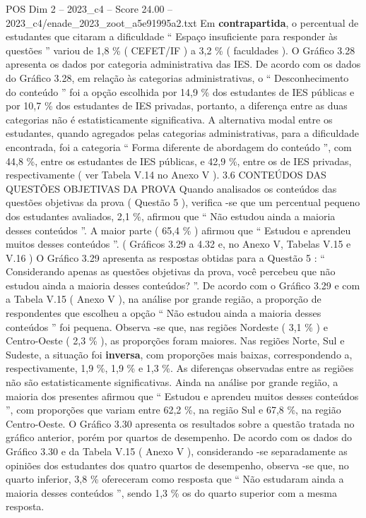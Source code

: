 \begin{textsample}{POS Dim 2 – 2023\_c4 – Score 24.00 – 2023\_c4/enade\_2023\_zoot\_a5e91995a2.txt}
Em \textbf{contrapartida}, o percentual de estudantes que citaram a dificuldade “ Espaço insuficiente para responder às questões ” variou de 1,8 \% ( CEFET/IF ) a 3,2 \% ( faculdades ).
O Gráfico 3.28 apresenta os dados por categoria administrativa das IES.
De acordo com os dados do Gráfico 3.28, em relação às categorias administrativas, o “ Desconhecimento do conteúdo ” foi a opção escolhida por 14,9 \% dos estudantes de IES públicas e por 10,7 \% dos estudantes de IES privadas, portanto, a diferença entre as duas categorias não é estatisticamente significativa.
A alternativa modal entre os estudantes, quando agregados pelas categorias administrativas, para a dificuldade encontrada, foi a categoria “ Forma diferente de abordagem do conteúdo ”, com 44,8 \%, entre os estudantes de IES públicas, e 42,9 \%, entre os de IES privadas, respectivamente ( ver Tabela V.14 no Anexo V ). 3.6 CONTEÚDOS DAS QUESTÕES OBJETIVAS DA PROVA Quando analisados os conteúdos das questões objetivas da prova ( Questão 5 ), verifica -se que um percentual pequeno dos estudantes avaliados, 2,1 \%, afirmou que “ Não estudou ainda a maioria desses conteúdos ”.
A maior parte ( 65,4 \% ) afirmou que “ Estudou e aprendeu muitos desses conteúdos ”. ( Gráficos 3.29 a 4.32 e, no Anexo V, Tabelas V.15 e V.16 ) O Gráfico 3.29 apresenta as respostas obtidas para a Questão 5 : “ Considerando apenas as questões objetivas da prova, você percebeu que não estudou ainda a maioria desses conteúdos? ”.
De acordo com o Gráfico 3.29 e com a Tabela V.15 ( Anexo V ), na análise por grande região, a proporção de respondentes que escolheu a opção “ Não estudou ainda a maioria desses conteúdos ” foi pequena.
Observa -se que, nas regiões Nordeste ( 3,1 \% ) e Centro-Oeste ( 2,3 \% ), as proporções foram maiores.
Nas regiões Norte, Sul e Sudeste, a situação foi \textbf{inversa}, com proporções mais baixas, correspondendo a, respectivamente, 1,9 \%, 1,9 \% e 1,3 \%.
As diferenças observadas entre as regiões não são estatisticamente significativas.
Ainda na análise por grande região, a maioria dos presentes afirmou que “ Estudou e aprendeu muitos desses conteúdos ”, com proporções que variam entre 62,2 \%, na região Sul e 67,8 \%, na região Centro-Oeste.
O Gráfico 3.30 apresenta os resultados sobre a questão tratada no gráfico anterior, porém por quartos de desempenho.
De acordo com os dados do Gráfico 3.30 e da Tabela V.15 ( Anexo V ), considerando -se separadamente as opiniões dos estudantes dos quatro quartos de desempenho, observa -se que, no quarto inferior, 3,8 \% ofereceram como resposta que “ Não estudaram ainda a maioria desses conteúdos ”, sendo 1,3 \% os do quarto superior com a mesma resposta.

\end{textsample}
